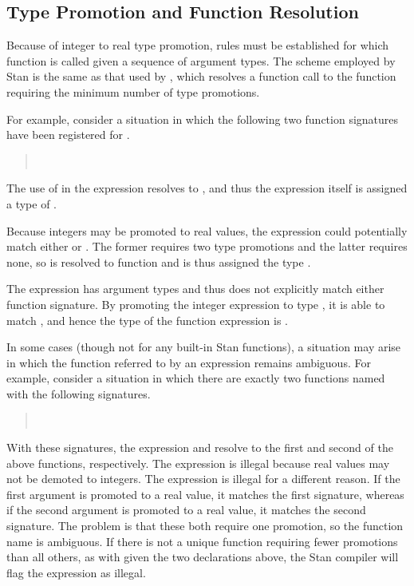\subsection{Type Promotion and Function Resolution}

Because of integer to real type promotion, rules must be established
for which function is called given a sequence of argument types.  The
scheme employed by Stan is the same as that used by \Cpp, which
resolves a function call to the function requiring the minimum number
of type promotions.

For example, consider a situation in which the following two function
signatures have been registered for .
%
\begin{quote}
\\
\end{quote}
%
The use of  in the expression  resolves
to , and thus the expression 
itself is assigned a type of .

Because integers may be promoted to real values, the expression
 could potentially match either 
or .  The former requires two type promotions and
the latter requires none, so  is resolved to function
 and is thus assigned the type .

The expression  has argument types 
and thus does not explicitly match either function signature.  By
promoting the integer expression  to type , it is
able to match , and hence the type of the
function expression  is .

In some cases (though not for any built-in Stan functions), a
situation may arise in which the function referred to by an
expression remains ambiguous.  For example, consider a situation in
which there are exactly two functions named  with the
following signatures.
%
\begin{quote}
\\
\end{quote}
%
With these signatures, the expression  and
 resolve to the first and second of the above
functions, respectively.  The expression  is
illegal because real values may not be demoted to integers.  The
expression  is illegal for a different reason.  If the
first argument is promoted to a real value, it matches the first
signature, whereas if the second argument is promoted to a real value,
it matches the second signature.  The problem is that these both
require one promotion, so the function name  is ambiguous.
If there is not a unique function requiring fewer promotions than all
others, as with  given the two declarations above,
the Stan compiler will flag the expression as illegal.

